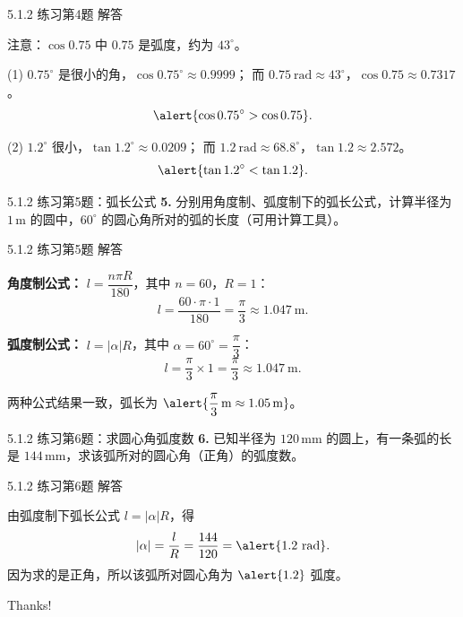 \documentclass[10pt,aspectratio=169,serif]{beamer}
\begin{document}
\begin{frame}[t]{5.1.2 练习第4题 解答}
\begin{tcolorbox}[colback=orange!10,colframe=orange,title=\textbf{解}]
注意：$\cos 0.75$ 中 $0.75$ 是弧度，约为 $43^\circ$。

\vspace{0.3em}
(1) $0.75^\circ$ 是很小的角，$\cos 0.75^\circ \approx 0.9999$；
而 $0.75\ \text{rad} \approx 43^\circ$，$\cos 0.75 \approx 0.7317$。
\[
\alert{\cos 0.75^\circ > \cos 0.75}.
\]

\vspace{0.5em}
(2) $1.2^\circ$ 很小，$\tan 1.2^\circ \approx 0.0209$；
而 $1.2\ \text{rad} \approx 68.8^\circ$，$\tan 1.2 \approx 2.572$。
\[
\alert{\tan 1.2^\circ < \tan 1.2}.
\]
\end{tcolorbox}
\end{frame}

\begin{frame}[t]{5.1.2 练习第5题：弧长公式}
\textbf{5.} 分别用角度制、弧度制下的弧长公式，计算半径为 $1\,\text{m}$ 的圆中，$60^\circ$ 的圆心角所对的弧的长度（可用计算工具）。
\end{frame}

\begin{frame}[t]{5.1.2 练习第5题 解答}
\begin{tcolorbox}[colback=orange!10,colframe=orange,title=\textbf{解}]
\textbf{角度制公式：} $l = \dfrac{n\pi R}{180}$，其中 $n=60$，$R=1$：
\[
l = \frac{60\cdot\pi\cdot 1}{180} = \frac{\pi}{3}\approx 1.047\ \text{m}.
\]

\vspace{0.5em}
\textbf{弧度制公式：} $l = |\alpha| R$，其中 $\alpha = 60^\circ = \dfrac{\pi}{3}$：
\[
l = \frac{\pi}{3}\times 1 = \frac{\pi}{3}\approx 1.047\ \text{m}.
\]

\vspace{0.5em}
两种公式结果一致，弧长为 $\alert{\dfrac{\pi}{3}\,\text{m}\approx 1.05\,\text{m}}$。
\end{tcolorbox}
\end{frame}

\begin{frame}[t]{5.1.2 练习第6题：求圆心角弧度数}
\textbf{6.} 已知半径为 $120\,\text{mm}$ 的圆上，有一条弧的长是 $144\,\text{mm}$，求该弧所对的圆心角（正角）的弧度数。
\end{frame}

\begin{frame}[t]{5.1.2 练习第6题 解答}
\begin{tcolorbox}[colback=orange!10,colframe=orange,title=\textbf{解}]
由弧度制下弧长公式 $l = |\alpha| R$，得
\[
|\alpha| = \frac{l}{R} = \frac{144}{120} = \alert{1.2\ \text{rad}}.
\]
因为求的是正角，所以该弧所对圆心角为 $\alert{1.2}$ 弧度。
\end{tcolorbox}
\end{frame}

\begin{frame}[c]
  \begin{center}
    {\Huge\calligra Thanks!}
  \end{center}
\end{frame}
\end{document}
